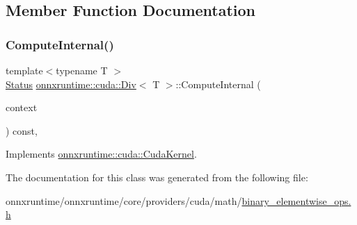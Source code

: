 \subsection{Member Function Documentation}
\mbox{\label{classonnxruntime_1_1cuda_1_1Div_af4080aced91c8ce3ce2e9a31f08b4f05}} 
\subsubsection{\texorpdfstring{Compute\+Internal()}{ComputeInternal()}}
{\footnotesize\ttfamily template$<$typename T $>$ \\
\mbox{\hyperlink{classonnxruntime_1_1common_1_1Status}{Status}} \mbox{\hyperlink{classonnxruntime_1_1cuda_1_1Div}{onnxruntime\+::cuda\+::\+Div}}$<$ T $>$\+::Compute\+Internal (\begin{DoxyParamCaption}\item[{\mbox{\hyperlink{classonnxruntime_1_1OpKernelContext}{Op\+Kernel\+Context}} $\ast$}]{context }\end{DoxyParamCaption}) const\hspace{0.3cm}{\ttfamily [override]}, {\ttfamily [virtual]}}



Implements \mbox{\hyperlink{classonnxruntime_1_1cuda_1_1CudaKernel_aca7af04ae448017d6023d30bba231ebb}{onnxruntime\+::cuda\+::\+Cuda\+Kernel}}.



The documentation for this class was generated from the following file\+:\begin{DoxyCompactItemize}
\item 
onnxruntime/onnxruntime/core/providers/cuda/math/\mbox{\hyperlink{binary__elementwise__ops_8h}{binary\+\_\+elementwise\+\_\+ops.\+h}}\end{DoxyCompactItemize}
